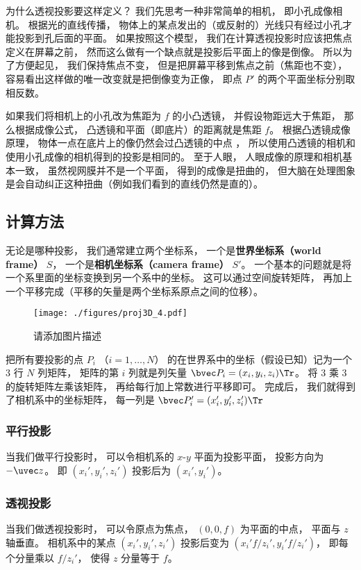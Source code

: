 为什么透视投影要这样定义？ 我们先思考一种非常简单的相机， 即小孔成像相机。 根据光的直线传播， 物体上的某点发出的（或反射的）光线只有经过小孔才能投影到孔后面的平面。 如果按照这个模型， 我们在计算透视投影时应该把焦点定义在屏幕之前， 然而这么做有一个缺点就是投影后平面上的像是倒像。 所以为了方便起见， 我们保持焦点不变， 但是把屏幕平移到焦点之前（焦距也不变）， 容易看出这样做的唯一改变就是把倒像变为正像， 即点 $P'$ 的两个平面坐标分别取相反数。 %

如果我们将相机上的小孔改为焦距为 $f$ 的小凸透镜， 并假设物距远大于焦距， 那么根据成像公式， 凸透镜和平面（即底片）的距离就是焦距 $f$。 根据凸透镜成像原理， 物体一点在底片上的像仍然会过凸透镜的中点%
， 所以使用凸透镜的相机和使用小孔成像的相机得到的投影是相同的。 至于人眼， 人眼成像的原理和相机基本一致， 虽然视网膜并不是一个平面， 得到的成像是扭曲的， 但大脑在处理图象是会自动纠正这种扭曲（例如我们看到的直线仍然是直的）。

\subsection{计算方法}
无论是哪种投影， 我们通常建立两个坐标系， 一个是\textbf{世界坐标系（world frame）} $S$， 一个是\textbf{相机坐标系}\textbf{（camera frame）} $S'$。 一个基本的问题就是将一个系里面的坐标变换到另一个系中的坐标。 这可以通过空间旋转矩阵， 再加上一个平移完成（平移的矢量是两个坐标系原点之间的位移）。
\begin{figure}[ht]
\centering
\texttt{[image: ./figures/proj3D\_4.pdf]}
\caption{请添加图片描述} \label{proj3D_fig4}
\end{figure}
把所有要投影的点 $P_i$ （$i = 1, \dots, N$） 的在世界系中的坐标（假设已知）记为一个 3 行 $N$ 列矩阵， 矩阵的第 $i$ 列就是列矢量 $\bvec P_i = (x_i, y_i, z_i)\Tr$。 将 3 乘 3 的旋转矩阵左乘该矩阵， 再给每行加上常数进行平移即可。 完成后， 我们就得到了相机系中的坐标矩阵， 每一列是 $\bvec P_i' = (x_i', y_i', z_i')\Tr$

\subsubsection{平行投影}
当我们做平行投影时， 可以令相机系的 $x$-$y$ 平面为投影平面， 投影方向为 $-\uvec z$。 即 $(x_i', y_i', z_i')$ 投影后为 $(x_i', y_i')$。

\subsubsection{透视投影}
当我们做透视投影时， 可以令原点为焦点， $(0, 0, f)$ 为平面的中点， 平面与 $z$ 轴垂直。 相机系中的某点 $(x_i', y_i', z_i')$ 投影后变为 $(x_i' f/z_i', y_i' f/z_i')$， 即每个分量乘以 $f/z_i'$， 使得 $z$ 分量等于 $f$。

